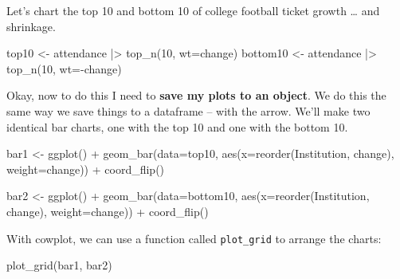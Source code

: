 \documentclass[
  letterpaper,
  DIV=11,
  numbers=noendperiod]{scrreprt}
\newenvironment{Shaded}{\begin{snugshade}}{\end{snugshade}}
\newcommand{\AttributeTok}[1]{\textcolor[rgb]{0.40,0.45,0.13}{#1}}
\newcommand{\DecValTok}[1]{\textcolor[rgb]{0.68,0.00,0.00}{#1}}
\newcommand{\FunctionTok}[1]{\textcolor[rgb]{0.28,0.35,0.67}{#1}}
\newcommand{\NormalTok}[1]{\textcolor[rgb]{0.00,0.23,0.31}{#1}}
\newcommand{\OtherTok}[1]{\textcolor[rgb]{0.00,0.23,0.31}{#1}}
\newcommand{\SpecialCharTok}[1]{\textcolor[rgb]{0.37,0.37,0.37}{#1}}
\begin{document}
Let's chart the top 10 and bottom 10 of college football ticket growth
\ldots{} and shrinkage.

\begin{Shaded}
\begin{Highlighting}[]
\NormalTok{top10 }\OtherTok{\textless{}{-}}\NormalTok{ attendance }\SpecialCharTok{|\textgreater{}} \FunctionTok{top\_n}\NormalTok{(}\DecValTok{10}\NormalTok{, }\AttributeTok{wt=}\NormalTok{change)}
\NormalTok{bottom10 }\OtherTok{\textless{}{-}}\NormalTok{ attendance }\SpecialCharTok{|\textgreater{}} \FunctionTok{top\_n}\NormalTok{(}\DecValTok{10}\NormalTok{, }\AttributeTok{wt=}\SpecialCharTok{{-}}\NormalTok{change)}
\end{Highlighting}
\end{Shaded}

Okay, now to do this I need to \textbf{save my plots to an object}. We
do this the same way we save things to a dataframe -- with the arrow.
We'll make two identical bar charts, one with the top 10 and one with
the bottom 10.

\begin{Shaded}
\begin{Highlighting}[]
\NormalTok{bar1 }\OtherTok{\textless{}{-}} \FunctionTok{ggplot}\NormalTok{() }\SpecialCharTok{+} 
  \FunctionTok{geom\_bar}\NormalTok{(}\AttributeTok{data=}\NormalTok{top10, }\FunctionTok{aes}\NormalTok{(}\AttributeTok{x=}\FunctionTok{reorder}\NormalTok{(Institution, change), }\AttributeTok{weight=}\NormalTok{change)) }\SpecialCharTok{+}
  \FunctionTok{coord\_flip}\NormalTok{()}
\end{Highlighting}
\end{Shaded}

\begin{Shaded}
\begin{Highlighting}[]
\NormalTok{bar2 }\OtherTok{\textless{}{-}} \FunctionTok{ggplot}\NormalTok{() }\SpecialCharTok{+} 
  \FunctionTok{geom\_bar}\NormalTok{(}\AttributeTok{data=}\NormalTok{bottom10, }\FunctionTok{aes}\NormalTok{(}\AttributeTok{x=}\FunctionTok{reorder}\NormalTok{(Institution, change), }\AttributeTok{weight=}\NormalTok{change)) }\SpecialCharTok{+}
  \FunctionTok{coord\_flip}\NormalTok{()}
\end{Highlighting}
\end{Shaded}

With cowplot, we can use a function called \texttt{plot\_grid} to
arrange the charts:

\begin{Shaded}
\begin{Highlighting}[]
\FunctionTok{plot\_grid}\NormalTok{(bar1, bar2) }
\end{Highlighting}
\end{Shaded}
\end{document}
